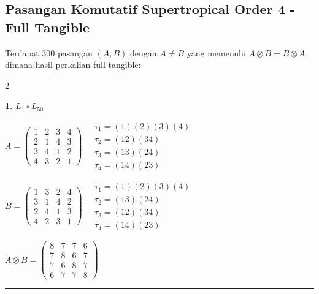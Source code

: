 
\subsection*{Pasangan Komutatif Supertropical Order 4 - Full Tangible}

Terdapat 300 pasangan $(A, B)$ dengan $A \neq B$ yang memenuhi $A \otimes B = B \otimes A$
dimana hasil perkalian full tangible:

\begin{multicols}{2}
\small

\noindent\textbf{1.} $L_{1} \circ L_{50}$

$A = \begin{pmatrix} 1 & 2 & 3 & 4 \\ 2 & 1 & 4 & 3 \\ 3 & 4 & 1 & 2 \\ 4 & 3 & 2 & 1 \end{pmatrix} \quad \begin{matrix} \tau_{1}=(1)(2)(3)(4) \\ \tau_{2}=(1 2)(3 4) \\ \tau_{3}=(1 3)(2 4) \\ \tau_{4}=(1 4)(2 3) \end{matrix}$

$B = \begin{pmatrix} 1 & 3 & 2 & 4 \\ 3 & 1 & 4 & 2 \\ 2 & 4 & 1 & 3 \\ 4 & 2 & 3 & 1 \end{pmatrix} \quad \begin{matrix} \tau_{1}=(1)(2)(3)(4) \\ \tau_{2}=(1 3)(2 4) \\ \tau_{3}=(1 2)(3 4) \\ \tau_{4}=(1 4)(2 3) \end{matrix}$

$A \otimes B = \begin{pmatrix} 8 & 7 & 7 & 6 \\ 7 & 8 & 6 & 7 \\ 7 & 6 & 8 & 7 \\ 6 & 7 & 7 & 8 \end{pmatrix}$

\vspace{0.3em}
\hrule
\vspace{0.3em}


\end{multicols}
